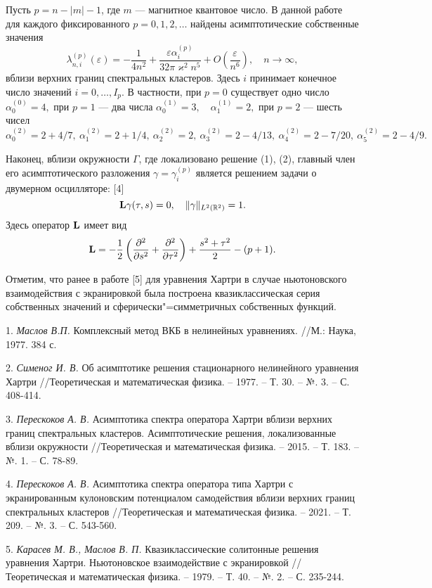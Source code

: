 Пусть $p=n- |m| -1$, где $m$ --- магнитное квантовое число. В данной работе  для каждого фиксированного
$ p=0,1,2,\dots $  найдены асимптотические собственные значения
$$
\lambda _ {n,i}^{(p)} (\varepsilon)= -\frac {1}{4n^2}+\frac{\varepsilon  \alpha_{i}^{(p)} }
{32 \pi \varkappa^2 n^5}+O\left(\frac {\varepsilon }{n^{6}}\right), \quad  n \to \infty ,
$$
вблизи верхних границ спектральных кластеров.
Здесь $i$ принимает конечное число значений  $i=0, \dots, I_{p}$. В частности, при  $p=0$ существует одно число
$
\alpha_{0}^{(0)}=4,
$
при $p=1$ --- два числа
$
\alpha_{0}^{(1)}=3, \quad \alpha_{1}^{(1)}=2,
$
при $p=2$ --- шесть чисел
$
\alpha_{0}^{(2)}=2+4/7, ~ \alpha_{1}^{(2)}=2+1/4, ~ \alpha_{2}^{(2)}=2, ~ \alpha_{3}^{(2)}=2-4/13,
~ \alpha_{4}^{(2)}=2-7/20,~ \alpha_{5}^{(2)}=2-4/9.
$

Наконец,  вблизи окружности $ \Gamma $, где локализовано решение (1), (2),
главный член его асимптотического разложения $ \gamma = \gamma _i^{(p)}$ является
 решением  задачи о двумерном осцилляторе: [4]
$$
{\bf L}\gamma (\tau,s)=0, \quad  \| \gamma \|_{L^2(\mathbb{R}^2)}=1.
$$
Здесь оператор ${\bf L}$ имеет вид
\begin{equation*}
 {\bf L}= -\frac{1}{2}\left(\frac {\partial ^{2}} {\partial s^{2} } + \frac {\partial ^{2}  } {\partial \tau ^{2} }\right)
 +\frac {s^2+\tau^2}{2}-(p+1).
 \label{9}
\end{equation*}

Отметим, что ранее в работе [5] для уравнения Хартри в случае ньютоновского взаимодействия с экранировкой
 была построена квазиклассическая серия собственных значений и сферически"=симметричных
собственных функций.


\litlist

1. {\it Маслов В.П.} Комплексный метод ВКБ в нелинейных уравнениях. //М.: Наука, 1977. 384 с.

2. {\it Сименог И. В.} Об асимптотике решения стационарного нелинейного уравнения Хартри //Теоретическая
и математическая физика. – 1977. – Т. 30. – №. 3. – С. 408-414.

3. {\it Перескоков А. В.} Асимптотика спектра оператора Хар\-три вблизи верхних границ
спектральных кластеров. Асимптотические решения, локализованные вблизи окружности //Теоретическая
и математическая физика. – 2015. – Т. 183. – №. 1. – С. 78-89.

4. {\it Перескоков А. В.} Асимптотика спектра оператора типа Хартри с
экранированным кулоновским потенциалом самодействия
вблизи верхних границ спектральных кластеров  //Теоретическая
и математическая физика. – 2021. – Т. 209. – №. 3. – С. 543-560.

5. {\it Карасев М. В., Маслов В. П.} Квазиклассические солитонные решения уравнения Хартри. Ньютоновское
взаимодействие с экранировкой //Теоретическая
и математическая физика. – 1979. – Т. 40. – №. 2. – С. 235-244.

